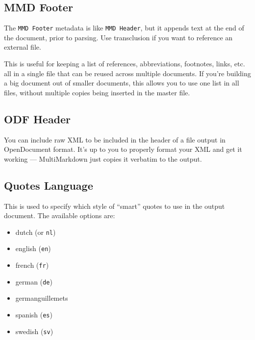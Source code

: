 \subsection{MMD Footer }
\label{mmdfooter}

The \texttt{MMD Footer} metadata is like \texttt{MMD Header}, but it appends text at the end of the document, prior to parsing. Use transclusion if you want to reference an external file.

This is useful for keeping a list of references, abbreviations, footnotes, links, etc. all in a single file that can be reused across multiple documents. If you're building a big document out of smaller documents, this allows you to use one list in all files, without multiple copies being inserted in the master file.

\subsection{ODF Header }
\label{odfheader}

You can include raw XML to be included in the header of a file output in
OpenDocument format. It's up to you to properly format your XML and get it
working --- MultiMarkdown just copies it verbatim to the output.

\subsection{Quotes Language }
\label{quoteslanguage}

This is used to specify which style of ``smart'' quotes to use in the output document. The available options are:

\begin{itemize}
\item dutch (or \texttt{nl})

\item english (\texttt{en})

\item french (\texttt{fr})

\item german (\texttt{de})

\item germanguillemets

\item spanish (\texttt{es})

\item swedish (\texttt{sv})

\end{itemize}

